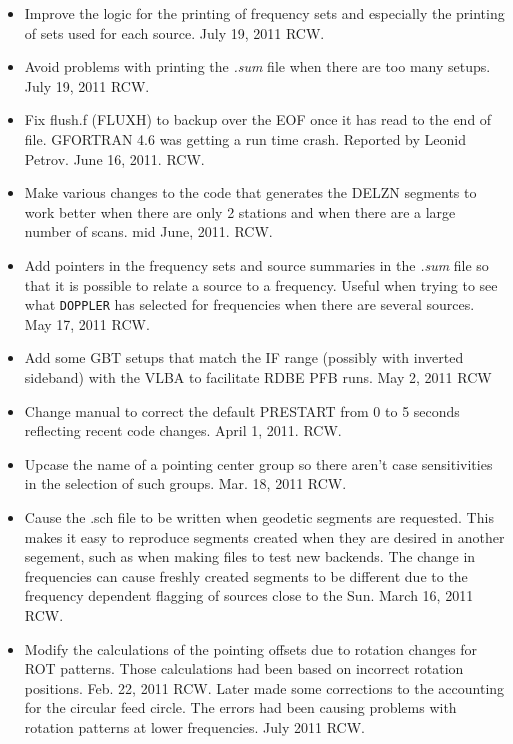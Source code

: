 \documentclass{report}
\begin{document}
\begin{itemize}
\item Improve the logic for the printing of frequency sets and
especially the printing of sets used for each source.  July 19, 2011 RCW.

\item Avoid problems with printing the {\sl .sum} file when there are
too many setups.  July 19, 2011 RCW.

\item Fix flush.f (FLUXH) to backup over the EOF once it has read to the
end of file.  GFORTRAN 4.6 was getting a run time crash.  Reported by
Leonid Petrov.  June 16, 2011.  RCW.

\item Make various changes to the code that generates the DELZN segments
to work better when there are only 2 stations and when there are a large
number of scans.  mid June, 2011. RCW.

\item Add pointers in the frequency sets and source summaries in the {\sl .sum}
file so that it is possible to relate a source to a frequency.  Useful when
trying to see what {\tt DOPPLER} has selected for frequencies when there are
several sources.  May 17, 2011 RCW.

\item Add some GBT setups that match the IF range (possibly with inverted
sideband) with the VLBA to facilitate RDBE PFB runs.  May 2, 2011  RCW

\item Change manual to correct the default PRESTART from 0 to 5 seconds
reflecting recent code changes.  April 1, 2011.  RCW.

\item Upcase the name of a pointing center group so there aren't
case sensitivities in the selection of such groups.  Mar. 18, 2011  RCW.

\item Cause the .sch file to be written when geodetic segments are
requested.  This makes it easy to reproduce segments created when
they are desired in another segement, such as when making files to
test new backends.  The change in frequencies can cause freshly
created segments to be different due to the frequency dependent flagging
of sources close to the Sun.  March 16, 2011  RCW.

\item  Modify the calculations of the pointing offsets due to rotation
changes for ROT patterns.  Those calculations had been based on
incorrect rotation positions.  Feb. 22, 2011  RCW.  Later made some
corrections to the accounting for the circular feed circle.  The
errors had been causing problems with rotation patterns at lower
frequencies.  July 2011  RCW.

\end{itemize}
\end{document}
